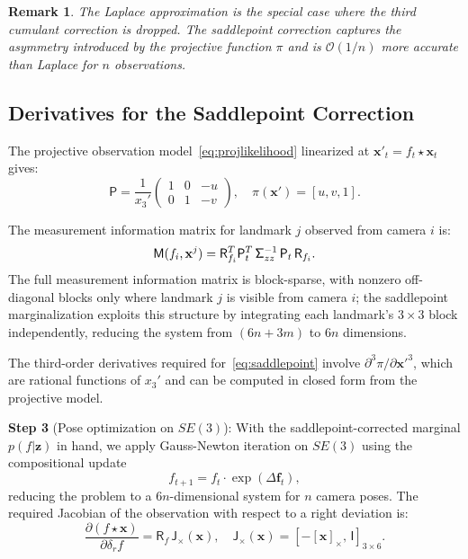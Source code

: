 \documentclass[journal]{IEEEtran}
\newcommand{\sfSigma}[1]{\mathsf{\Sigma}_\mathnormal{#1}}
\newcommand{\beq}{\begin{equation}}
\newcommand{\eeq}{\end{equation}}
\newtheorem{remark}{Remark}
\begin{document}
\begin{remark}
The Laplace approximation is the special case where 
the third cumulant correction is dropped. The saddlepoint 
correction captures the asymmetry introduced by the 
projective function $\pi$ and is $\mathcal{O}(1/n)$ 
more accurate than Laplace for $n$ observations.
\end{remark}

\subsection{Derivatives for the Saddlepoint Correction}

The projective observation model~\eqref{eq:projlikelihood} 
linearized at $\mathbf{x}'_t = f_t \star \mathbf{x}_t$ gives:
\beq
    \mathsf{P} = \frac{1}{x_3'}\begin{pmatrix}
    1 & 0 & -u \\ 0 & 1 & -v
    \end{pmatrix},\quad
    \pi(\mathbf{x}') = [u, v, 1].
    \label{eq:projjacobian}
\eeq

The measurement information matrix 
for landmark $j$ observed from camera $i$ is:
\beq
    \mathsf{M}(f_i, \mathbf{x}^j) = 
    \mathsf{R}_{f_i}^T \mathsf{P}_t^T\, 
    \sfSigma{zz}^{-1}\, \mathsf{P}_t\, \mathsf{R}_{f_i}.
    \label{eq:Mmatrix}
\eeq
The full measurement information matrix is block-sparse, with nonzero off-diagonal blocks only where landmark $j$ is visible from camera $i$; the saddlepoint marginalization exploits this structure by integrating each landmark's $3\times 3$ block independently, reducing the system from $(6n+3m)$ to $6n$ dimensions.

The third-order derivatives required for~\eqref{eq:saddlepoint} 
involve $\partial^3 \pi / \partial \mathbf{x}'^3$, which 
are rational functions of $x_3'$ and can be computed in 
closed form from the projective model.

\textbf{Step 3} (Pose optimization on $SE(3)$): 
With the saddlepoint-corrected marginal 
$p(f | \mathbf{z})$ in hand, we apply Gauss-Newton 
iteration on $SE(3)$ using the compositional update
\beq
    f_{t+1} = f_t \cdot \exp(\Delta \mathbf{f}_t),
    \label{eq:poseupdate}
\eeq
reducing the problem to a $6n$-dimensional system 
for $n$ camera poses. The required Jacobian of the 
observation with respect to a right deviation is:
\beq
    \frac{\partial(f \star \mathbf{x})}{\partial \delta_r f} = 
    \mathsf{R}_f\, \mathsf{J}_\times(\mathbf{x}),\quad
    \mathsf{J}_\times(\mathbf{x}) = 
    [-[\mathbf{x}]_\times,\, \mathsf{I}]_{3 \times 6}.
    \label{eq:posejacobian}
\eeq
\end{document}
